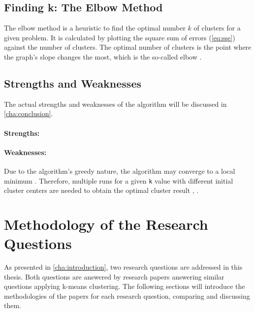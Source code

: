 \subsection{Finding k: The Elbow Method}
The elbow method is a heuristic to find the optimal number $k$ of clusters for a given problem.
It is calculated by plotting the square sum of errors (\autoref{eq:sse}) against the number of clusters.
The optimal number of clusters is the point where the graph's slope changes the most, which is the so-called elbow \cite{SYA-IKC}.

\subsection{Strengths and Weaknesses}
The actual strengths and weaknesses of the algorithm will be discussed in \autoref{cha:conclusion}.

\paragraph*{Strengths:}

\paragraph*{Weaknesses:}
Due to the algorithm's greedy nature, the algorithm may converge to a local minimum \cite{JAI-DCB}.
Therefore, multiple runs for a given \texttt{k} value with different initial cluster centers are needed to obtain the optimal cluster result \cite{EZU-CPF}, \cite{BAR-LVG}.

\section{Methodology of the Research Questions}
As presented in \autoref{cha:introduction}, two research questions are addressed in this thesis.
Both questions are answered by research papers answering similar questions applying k-means clustering.
The following sections will introduce the methodologies of the papers for each research question, comparing and discussing them.


